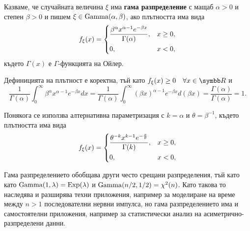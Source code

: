 \documentclass[
  headings=standardclasses,
  bibliography=totocnumbered,
]{scrartcl}
\begin{document}
\begin{definition}
  Казваме, че случайната величина \( \xi \) има \textbf{гама разпределение} с мащаб \( \alpha > 0 \) и степен \( \beta > 0 \) и пишем \( \xi \in \operatorname{Gamma}(\alpha, \beta) \), ако плътността има вида
  \begin{align*}
    f_\xi(x)
    =
    \begin{dcases}
      \frac {\beta^\alpha x^{\alpha-1} e^{-\beta x}} {\Gamma(\alpha)}, &x \geq 0, \\
      0, &x < 0,
    \end{dcases}
  \end{align*}
  където \( \Gamma(x) \) е \( \Gamma \)-функцията на Ойлер.

  Дефиницията на плътност е коректна, тъй като \( f_\xi(x) \geq 0\quad\forall x \in \R \) и
  \begin{equation*}
    \frac 1 {\Gamma(\alpha)} \int_0^\infty {\beta^\alpha x^{\alpha-1} e^{-\beta x}} dx
    =
    \frac 1 {\Gamma(\alpha)} \int_0^\infty {{(\beta x)}^{\alpha-1} e^{-\beta x}} d(\beta x)
    =
    \frac {\Gamma(\alpha)} {\Gamma(\alpha)}
    =
    1.
  \end{equation*}

  Понякога се използва алтернативна параметризация с \( k = \alpha \) и \( \theta = \beta^{-1} \), където плътността има вида
  \begin{align*}
    f_\xi(x)
    =
    \begin{dcases}
      \frac {\theta^{-k} x^{k-1} e^{-\frac x \theta}} {\Gamma(k)}, &x \geq 0, \\
      0, &x < 0,
    \end{dcases}
  \end{align*}
\end{definition}

Гама разпределението обобщава други често срещани разпределения, тъй като като \( \operatorname{Gamma}(1, \lambda) = \operatorname{Exp}(\lambda) \) и \( \operatorname{Gamma}(n/2, 1/2) = \chi^2(n) \). Като такова то наследява и разширява техни приложения, например за моделиране на време между \( n > 1 \) последователни нервни импулса, но гама разпределението има и самостоятелни приложения, например за статистически анализ на асиметрично-разпределени данни.
\end{document}
